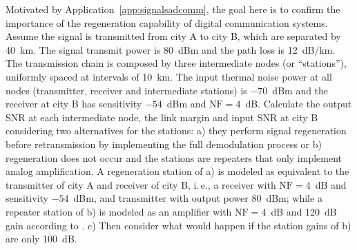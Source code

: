 \begin{exercises}
\item Motivated by Application~\ref{app:signalsadcomm}, the goal here is to confirm the importance of the regeneration capability of digital communication systems. Assume the signal is transmitted from city A to city B, which are separated by 40~km. The signal transmit power is 80~dBm and the path loss is 12~dB/km.
The transmission chain is composed by three intermediate nodes (or ``stations''), uniformly spaced at intervals of 10~km. The input thermal noise power at all nodes (transmitter, receiver and intermediate stations) is $-70$~dBm and the receiver at city B has sensitivity $-54$~dBm and $\textrm{NF}=4$~dB. Calculate the output SNR at each intermediate node, the link margin and input SNR at city B considering two alternatives for the stations: a) they perform signal regeneration before retransmission by implementing the full demodulation process or b) regeneration does not occur and the stations are repeaters that only implement analog amplification. 
A regeneration station of a) is modeled as equivalent to the transmitter of city A and receiver of city B, i.\,e., a receiver with $\textrm{NF}=4$~dB and sensitivity $-54$~dBm, and transmitter with output power 80~dBm; while a repeater station of b) is modeled as an amplifier with $\textrm{NF}=4$~dB and 120~dB gain according to .
c) Then consider what would happen if the station gains of b) are only 100~dB.


\end{exercises}
%
